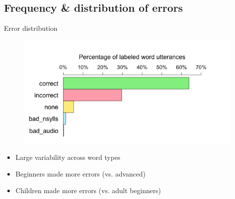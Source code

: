 \documentclass[xcolor={dvipsnames}]{beamer}
\begin{document}
	\subsection{Frequency \& distribution of errors}
		\begin{frame}{Error distribution}
		
		
		\begin{figure}
			\centering
			\includegraphics[width=\textwidth]{../img/plots/overallJudgments-axisTop-noLabels}

			\label{fig:results:overallbars}
		\end{figure}
		
		\begin{itemize}
		\item Large variability across word types %
		\item Beginners made more errors (vs. advanced)
		\item Children made more errors (vs. adult beginners)
		\end{itemize}
		\end{frame}
		
\end{document}
